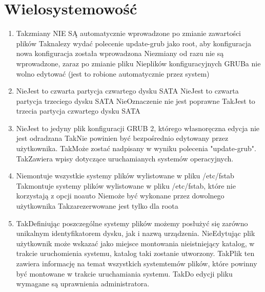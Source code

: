 \newpage
\section{Wielosystemowość}
\begin{enumerate}

	\item {}
	{Tak}{zmiany NIE SĄ automatycznie wprowadzone po zmianie zawartości plików}
	{Tak}{nalezy wydać polecenie update-grub jako root, aby konfiguracja nowa konfiguracja została wprowadzona}
	{Nie}{zmiany od razu nie są wprowadzone, zaraz po zmianie pliku}
	{Nie}{plików konfiguracyjnych GRUBa nie wolno edytować (jest to robione automatycznie przez system)}
	
	\item {}
	{Nie}{Jest to czwarta partycja czwartego dysku SATA}
	{Nie}{Jest to czwarta partycja trzeciego dysku SATA}
	{Nie}{Oznaczenie nie jest poprawne}
	{Tak}{Jest to trzecia partycja czwartego dysku SATA}
	
	\item {}
	{Nie}{Jest to jedyny plik konfiguracji GRUB 2, którego własnoręczna edycja nie jest odradzana}
	{Tak}{Nie powinien być bezpośrednio edytowany przez użytkownika.}
	{Tak}{Może zostać nadpisany w wyniku polecenia "update-grub".}
	{Tak}{Zawiera wpisy dotyczące uruchamianych systemów operacyjnych.}
	
	\item {}
	{Nie}{montuje wszystkie systemy plików wylistowane w pliku /etc/fstab}
	{Tak}{montuje systemy plików wylistowane w pliku /etc/fstab, które nie korzystają z opcji noauto}
	{Nie}{może być wykonane przez dowolnego użytkownika}
	{Tak}{zarezerwowane jest tylko dla roota}
	
	\item {}
	{Tak}{Definiując poszczególne systemy plików możemy posłużyć się zarówno unikalnym identyfikatorem dysku, jak i nazwą urządzenia.}
	{Nie}{Edytując plik użytkownik może wskazać jako miejsce montowania nieistniejący katalog, w trakcie uruchomienia systemu, katalog taki zostanie utworzony.}
	{Tak}{Plik ten zawiera informację na temat wszystkich systemtemów plików, które powinny być montowane w trakcie uruchamiania systemu.}
	{Tak}{Do edycji pliku wymagane są uprawnienia administratora.}
	

\end{enumerate}
